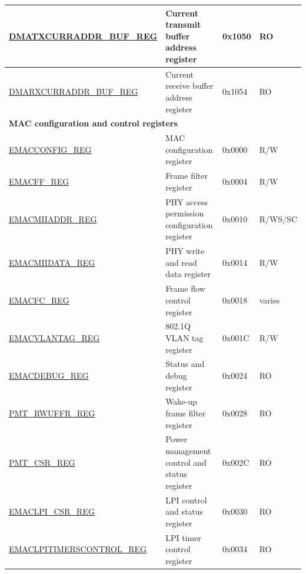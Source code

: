 \begin{longtable}{ |m{6cm} |m{5.3cm} | m{2cm} | m{2.2cm} | }
\hyperref[regdesc:DMATXCURRADDRBUFREG]{DMATXCURRADDR\_BUF\_REG} & Current transmit buffer address register & 0x1050 & RO \\ \hline
\hyperref[regdesc:DMARXCURRADDRBUFREG]{DMARXCURRADDR\_BUF\_REG} & Current receive buffer address register & 0x1054 & RO \\ \hline
\multicolumn{4}{|l|}{\textbf{MAC configuration and control registers}} \\ \hline
\hyperref[regdesc:EMACCONFIGREG]{EMACCONFIG\_REG} & MAC configuration register & 0x0000 & R/W \\ \hline
\hyperref[regdesc:EMACFFREG]{EMACFF\_REG} & Frame filter register & 0x0004 & R/W \\ \hline
\hyperref[regdesc:EMACMIIADDRREG]{EMACMIIADDR\_REG} & PHY access permission configuration register  & 0x0010 & R/WS/SC \\ \hline
\hyperref[regdesc:EMACMIIDATAREG]{EMACMIIDATA\_REG} & PHY write and read data register & 0x0014 & R/W \\ \hline
\hyperref[regdesc:EMACFLOWCONTROLREG]{EMACFC\_REG} & Frame flow control register & 0x0018 & varies \\ \hline

\hyperref[regdesc:EMACVLANTAGREG]{EMACVLANTAG\_REG} & 802.1Q VLAN tag register & 0x001C & R/W \\ \hline

\hyperref[regdesc:EMACDEBUGREG]{EMACDEBUG\_REG} & Status and debug register & 0x0024 & RO \\ \hline
\hyperref[regdesc:PMTRWUFFRREG]{PMT\_RWUFFR\_REG} &  Wake-up frame filter register & 0x0028 & RO \\ \hline
\hyperref[regdesc:PMTCSRREG]{PMT\_CSR\_REG} & Power management control and status register & 0x002C & RO \\ \hline
\hyperref[regdesc:EMACLPICSRREG]{EMACLPI\_CSR\_REG} & LPI control and status register & 0x0030 & RO \\ \hline
\hyperref[regdesc:EMACLPITIMERSCONTROLREG]{EMACLPITIMERSCONTROL\_REG} & LPI timer control register & 0x0034 & RO \\ \hline


\end{longtable}

